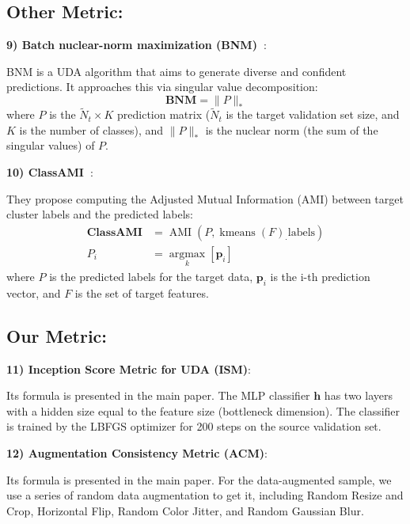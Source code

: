 \subsection{Other Metric:} 

\textbf{9) Batch nuclear-norm maximization (BNM)~\cite{BNM,ThreeNV}}:

BNM is a UDA algorithm that aims to generate diverse and confident predictions. It approaches this via singular value decomposition:
\begin{equation}
\boldsymbol{BNM}=\|P\|_*
\end{equation}
where $P$ is the $\tilde{N}_t \times K$ prediction matrix ($\tilde{N}_t$ is the target validation set size, and $K$ is the number of classes), and $\|P\|_*$ is the nuclear norm (the sum of the singular values) of $P$.

\textbf{10) ClassAMI~\cite{ThreeNV}}:

They propose computing the Adjusted Mutual Information (AMI) between target cluster labels and the predicted labels:
\begin{align}
\boldsymbol{ClassAMI}&=\operatorname{AMI}(P, \operatorname{kmeans}(F)_{\cdot} \text{labels}) \\
P_i &= \underset{k}{\operatorname{argmax}}
[\boldsymbol{p}_i]
\end{align}
where $P$ is the predicted labels for the target data, $\boldsymbol{p}_i$ is the i-th prediction vector, and $F$ is the set of target features.

\subsection{Our Metric:} 

\textbf{11) Inception Score Metric for UDA (ISM)}:

Its formula is presented in the main paper. The MLP classifier $\boldsymbol{h}$ has two layers with a hidden size equal to the feature size (bottleneck dimension). The classifier is trained by the LBFGS optimizer for 200 steps on the source validation set.

\textbf{12) Augmentation Consistency Metric (ACM)}:

Its formula is presented in the main paper. For the data-augmented sample, we use a series of random data augmentation to get it, including Random Resize and Crop, Horizontal Flip, Random Color Jitter, and Random Gaussian Blur.

